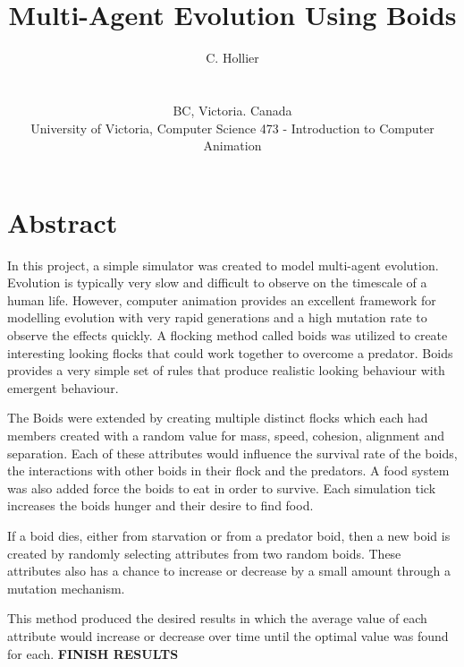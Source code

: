 \documentclass{egpubl}
\title[Evolution Using Boids]%
      {Multi-Agent Evolution Using Boids}
\author[C. Hollier]
{\parbox{\textwidth}{\centering C. Hollier}
        \\
{\parbox{\textwidth}{\centering BC, Victoria. Canada\\
         University of Victoria, Computer Science 473 - Introduction to Computer Animation
       }
}
}
\begin{document}
\maketitle
\section{Abstract}
In this project, a simple simulator was created to model multi-agent evolution. Evolution is typically very slow and difficult to observe on the timescale of a human life. However, computer animation provides an excellent framework for modelling evolution with very rapid generations and a high mutation rate to observe the effects quickly. A flocking method called boids was utilized to create interesting looking flocks that could work together to overcome a predator. Boids provides a very simple set of rules that produce realistic looking behaviour with emergent behaviour.
\par
The Boids were extended by creating multiple distinct flocks which each had members created with a random value for mass, speed, cohesion, alignment and separation. Each of these attributes would influence the survival rate of the boids, the interactions with other boids in their flock and the predators. A food system was also added force the boids to eat in order to survive. Each simulation tick increases the boids hunger and their desire to find food.
\par
If a boid dies, either from starvation or from a predator boid, then a new boid is created by randomly selecting attributes from two random boids. These attributes also has a chance to increase or decrease by a small amount through a mutation mechanism.
\par
This method produced the desired results in which the average value of each attribute would increase or decrease over time until the optimal value was found for each. \textbf{FINISH RESULTS} 
\end{document}
